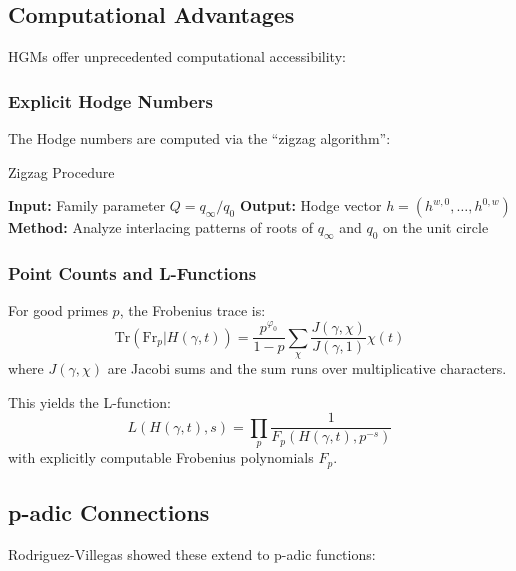 \subsection{Computational Advantages}

HGMs offer unprecedented computational accessibility:

\subsubsection{Explicit Hodge Numbers}

The Hodge numbers are computed via the ``zigzag algorithm'':

\begin{algorithm}[h]
\caption{Zigzag Procedure}
\label{alg:zigzag}
\begin{algorithmic}
\State \textbf{Input:} Family parameter $Q = q_\infty/q_0$
\State \textbf{Output:} Hodge vector $h = (h^{w,0}, \ldots, h^{0,w})$
\State \textbf{Method:} Analyze interlacing patterns of roots of $q_\infty$ and $q_0$ on the unit circle
\end{algorithmic}
\end{algorithm}

\subsubsection{Point Counts and L-Functions}

\begin{theorem}
\label{thm:hgm_point_count}
For good primes $p$, the Frobenius trace is:
\begin{equation}
\text{Tr}(\text{Fr}_p | H(\gamma, t)) = \frac{p^{\varphi_0}}{1-p} \sum_\chi \frac{J(\gamma, \chi)}{J(\gamma, 1)} \chi(t)
\end{equation}
where $J(\gamma, \chi)$ are Jacobi sums and the sum runs over multiplicative characters.
\end{theorem}

This yields the L-function:
\begin{equation}
L(H(\gamma, t), s) = \prod_p \frac{1}{F_p(H(\gamma, t), p^{-s})}
\end{equation}
with explicitly computable Frobenius polynomials $F_p$.

\subsection{p-adic Connections}

Rodriguez-Villegas showed these extend to p-adic functions:

